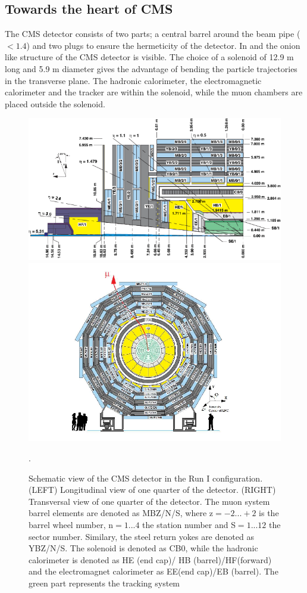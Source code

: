 \subsection{Towards the heart of CMS}
The CMS detector consists of two parts; a central barrel around the beam pipe (\abspsrap $<1.4$) and two plugs to ensure the hermeticity of the detector. In  and  the onion like structure of the CMS detector is visible. The choice of a solenoid of 12.9 \si{ \meter}  long and 5.9 \si{ \meter}
diameter gives the advantage of bending the particle trajectories in the transverse plane. The hadronic calorimeter,  the electromagnetic calorimeter and the tracker are within the solenoid, while the muon chambers are placed outside the solenoid.
\begin{figure}[ht!]
	\centering
	\includegraphics[width=1.\linewidth]{2_ExperimentalSetup/Figures/cmsview1}
	\includegraphics[width=1.\linewidth]{2_ExperimentalSetup/Figures/cmsview}
 \caption{Schematic view of the CMS detector in the Run I configuration. (LEFT) Longitudinal view of one quarter of the detector. (RIGHT)  Transversal view of one quarter of the detector. The muon system barrel elements are denoted as MBZ/N/S, where z$=-2...+2$ is the barrel wheel number, n$=1...4$ the station number and S$=1...12$ the sector number. Similary, the steel return yokes are denoted as YBZ/N/S. The solenoid is denoted as CB0, while the hadronic calorimeter is denoted as HE (end cap)/ HB (barrel)/HF(forward) and the electromagnet calorimeter as EE(end cap)/EB (barrel). The green part represents the tracking system\cite{Chatrchyan:1223944}}.
	\label{fig:CMSview}
\end{figure}

